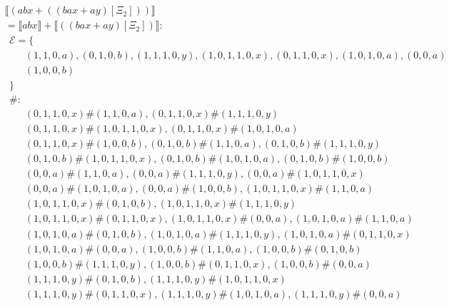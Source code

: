 \begin{align*} 
	 &  & \\ 
	 & \llbracket (abx + ((bax + ay) [\Xi_2])) \rrbracket & \\ 
	 & = \llbracket abx \rrbracket + \llbracket ((bax + ay) [\Xi_2]) \rrbracket:  & \\ 
	 & \ \ \mathcal{{E}}= \{  & \\ 
	 & \qquad (1, 1, 0, a), (0, 1, 0, b), (1, 1, 1, 0, y), (1, 0, 1, 1, 0, x), (0, 1, 1, 0, x), (1, 0, 1, 0, a), (0, 0, a) \\ 
	 & \qquad (1, 0, 0, b) \\ 
	 & \ \ \} & \\ 
	 & \ \ \#: & \\ 
	 & \qquad (0, 1, 1, 0, x) \# (1, 1, 0, a), (0, 1, 1, 0, x) \# (1, 1, 1, 0, y) \\ 
	 & \qquad (0, 1, 1, 0, x) \# (1, 0, 1, 1, 0, x), (0, 1, 1, 0, x) \# (1, 0, 1, 0, a) \\ 
	 & \qquad (0, 1, 1, 0, x) \# (1, 0, 0, b), (0, 1, 0, b) \# (1, 1, 0, a), (0, 1, 0, b) \# (1, 1, 1, 0, y) \\ 
	 & \qquad (0, 1, 0, b) \# (1, 0, 1, 1, 0, x), (0, 1, 0, b) \# (1, 0, 1, 0, a), (0, 1, 0, b) \# (1, 0, 0, b) \\ 
	 & \qquad (0, 0, a) \# (1, 1, 0, a), (0, 0, a) \# (1, 1, 1, 0, y), (0, 0, a) \# (1, 0, 1, 1, 0, x) \\ 
	 & \qquad (0, 0, a) \# (1, 0, 1, 0, a), (0, 0, a) \# (1, 0, 0, b), (1, 0, 1, 1, 0, x) \# (1, 1, 0, a) \\ 
	 & \qquad (1, 0, 1, 1, 0, x) \# (0, 1, 0, b), (1, 0, 1, 1, 0, x) \# (1, 1, 1, 0, y) \\ 
	 & \qquad (1, 0, 1, 1, 0, x) \# (0, 1, 1, 0, x), (1, 0, 1, 1, 0, x) \# (0, 0, a), (1, 0, 1, 0, a) \# (1, 1, 0, a) \\ 
	 & \qquad (1, 0, 1, 0, a) \# (0, 1, 0, b), (1, 0, 1, 0, a) \# (1, 1, 1, 0, y), (1, 0, 1, 0, a) \# (0, 1, 1, 0, x) \\ 
	 & \qquad (1, 0, 1, 0, a) \# (0, 0, a), (1, 0, 0, b) \# (1, 1, 0, a), (1, 0, 0, b) \# (0, 1, 0, b) \\ 
	 & \qquad (1, 0, 0, b) \# (1, 1, 1, 0, y), (1, 0, 0, b) \# (0, 1, 1, 0, x), (1, 0, 0, b) \# (0, 0, a) \\ 
	 & \qquad (1, 1, 1, 0, y) \# (0, 1, 0, b), (1, 1, 1, 0, y) \# (1, 0, 1, 1, 0, x) \\ 
	 & \qquad (1, 1, 1, 0, y) \# (0, 1, 1, 0, x), (1, 1, 1, 0, y) \# (1, 0, 1, 0, a), (1, 1, 1, 0, y) \# (0, 0, a) \\ 

\end{align*}
